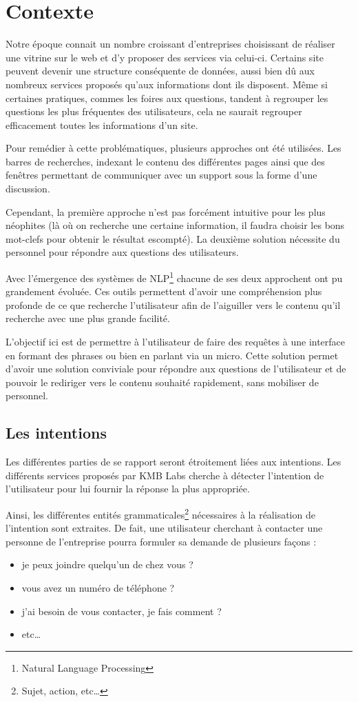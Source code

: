\documentclass[12pt,a4paper,oneside]{scrreprt}
\begin{document}
\chapter{Contexte}
Notre époque connait un nombre croissant d'entreprises choisissant de réaliser une vitrine sur le web et d'y proposer des services via celui-ci. Certains site peuvent devenir une structure conséquente de données, aussi bien dû aux nombreux services proposés qu'aux informations dont ils disposent. Même si certaines pratiques, commes les foires aux questions, tandent à regrouper les questions les plus fréquentes des utilisateurs, cela ne saurait regrouper efficacement toutes les informations d'un site.

Pour remédier à cette problématiques, plusieurs approches ont été utilisées. Les barres de recherches, indexant le contenu des différentes pages ainsi que des fenêtres permettant de communiquer avec un support sous la forme d'une discussion.

Cependant, la première approche n'est pas forcément intuitive pour les plus néophites (là où on recherche une certaine information, il faudra choisir les bons mot-clefs pour obtenir le résultat escompté). La deuxième solution nécessite du personnel pour répondre aux questions des utilisateurs.

Avec l'émergence des systèmes de NLP\footnote{Natural Language Processing} chacune de ses deux approchent ont pu grandement évoluée. Ces outils permettent d'avoir une compréhension plus profonde de ce que recherche l'utilisateur afin de l'aiguiller vers le contenu qu'il recherche avec une plus grande facilité.

L'objectif ici est de permettre à l'utilisateur de faire des requêtes à une interface en formant des phrases ou bien en parlant via un micro. Cette solution permet d'avoir une solution conviviale pour répondre aux questions de l'utilisateur et de pouvoir le rediriger vers le contenu souhaité rapidement, sans mobiliser de personnel.

\section{Les intentions}

Les différentes parties de se rapport seront étroitement liées aux intentions. Les différents services proposés par KMB Labs cherche à détecter l'intention de l'utilisateur pour lui fournir la réponse la plus appropriée.

Ainsi, les différentes entités grammaticales\footnote{Sujet, action, etc\dots} nécessaires à la réalisation de l'intention sont extraites. De fait, une utilisateur cherchant à contacter une personne de l'entreprise pourra formuler sa demande de plusieurs façons :
\begin{itemize}
	\item \og je peux joindre quelqu'un de chez vous ?\fg{}
	\item \og vous avez un numéro de téléphone ?\fg{}
	\item \og j'ai besoin de vous contacter, je fais comment ?\fg{}
	\item etc\dots
\end{itemize}
\end{document}
